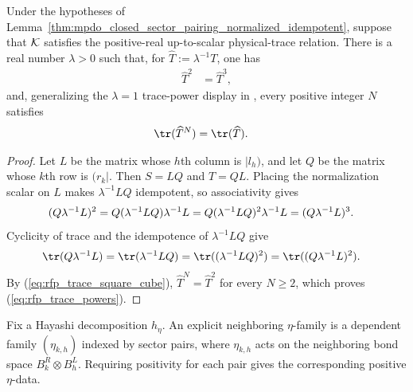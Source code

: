\begin{lemma}
    \label{thm:mpdo_closed_sector_trace_normalized_pow_relation}
    \leanok
    Under the hypotheses of
    Lemma~\ref{thm:mpdo_closed_sector_pairing_normalized_idempotent},
    suppose that ${\cal K}$ satisfies the positive-real up-to-scalar
    physical-trace relation. There is a real number $\lambda>0$ such that, for
    $\widehat T:=\lambda^{-1}T$, one has
    \begin{align}
        \widehat T^2 & =\widehat T^3, \label{eq:rfp_trace_square_cube}
    \end{align}
    and, generalizing the $\lambda=1$ trace-power display in
    \cite[Appendix~C.2, lines~1490--1497]{Cirac2016MPDO_arXiv}, every positive
    integer $N$ satisfies
    \begin{align}
        \tr(\widehat T^N) & =\tr(\widehat T). \label{eq:rfp_trace_powers}
    \end{align}
\end{lemma}

\begin{proof}
    \leanok
    Let $L$ be the matrix whose $h$th column is $|l_h)$, and let $Q$ be the
    matrix whose $k$th row is $(r_k|$. Then $S=LQ$ and $T=QL$. Placing the
    normalization scalar on $L$ makes $\lambda^{-1}LQ$ idempotent, so
    associativity gives
    \begin{align}
        (Q\lambda^{-1}L)^2
         & =Q(\lambda^{-1}LQ)\lambda^{-1}L
        =Q(\lambda^{-1}LQ)^2\lambda^{-1}L
        =(Q\lambda^{-1}L)^3. \notag
    \end{align}
    Cyclicity of trace and the idempotence of $\lambda^{-1}LQ$ give
    \begin{align}
        \tr(Q\lambda^{-1}L)
         & =\tr(\lambda^{-1}LQ)
        =\tr((\lambda^{-1}LQ)^2)
        =\tr((Q\lambda^{-1}L)^2). \notag
    \end{align}
    By (\ref{eq:rfp_trace_square_cube}),
    $\widehat T^N=\widehat T^2$ for every $N\geq2$, which proves
    (\ref{eq:rfp_trace_powers}).
\end{proof}

\begin{definition}
    \label{def:mpdo_explicit_eta_operators}
    \leanok
    Fix a Hayashi decomposition $h_\eta$. An explicit neighboring
    $\eta$-family is a dependent family $(\eta_{k,h})$ indexed by sector pairs,
    where $\eta_{k,h}$ acts on the neighboring bond space
    $B_k^{R} \otimes B_h^{L}$. Requiring positivity for each pair gives the
    corresponding positive $\eta$-data.
\end{definition}

